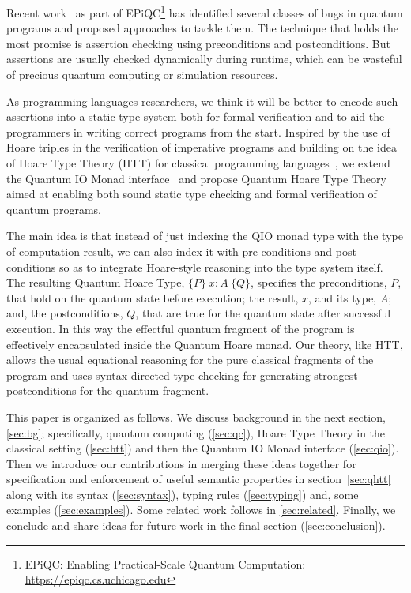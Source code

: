\documentclass[acmsmall,nonacm,timestamp,review=false,anonymous=false]{acmart}
\begin{document}
Recent work~\cite{huang_qdb:_2018,huang_statistical_2019} as part of EPiQC\footnote{EPiQC: Enabling Practical-Scale Quantum Computation:  \url{https://epiqc.cs.uchicago.edu}} has identified several classes of bugs in quantum programs and proposed approaches to tackle them. The technique that holds the most promise is assertion checking using preconditions and postconditions. But assertions are usually checked dynamically during runtime, which can be wasteful of precious quantum computing or simulation resources.

As programming languages researchers, we think it will be better to encode such assertions into a static type system both for formal verification and to aid the programmers in writing correct programs from the start. Inspired by the use of Hoare triples in the verification of imperative programs and building on the idea of Hoare Type Theory (HTT) for classical programming languages~\cite{nanevski_hoare_2008}, we extend the Quantum IO Monad interface~\cite{qio} and propose Quantum Hoare Type Theory aimed at enabling both sound static type checking and formal verification of quantum programs.

The main idea is that instead of just indexing the QIO monad type with the type of computation result, we can also index it with pre-conditions and post-conditions so as to integrate Hoare-style reasoning into the type system itself. The resulting Quantum Hoare Type, $\{P\}\ x{ : }A\ \{Q\}$, specifies the preconditions, $P$, that hold on the quantum state before execution; the result, $x$, and its type, $A$; and, the postconditions, $Q$, that are true for the quantum state after successful execution. In this way the effectful quantum fragment of the program is effectively encapsulated inside the Quantum Hoare monad. Our theory, like HTT, allows the usual equational reasoning for the pure classical fragments of the program and uses syntax-directed type checking for generating strongest postconditions for the quantum fragment.

This paper is organized as follows. We discuss background in the next section, \cref{sec:bg}; specifically, quantum computing (\cref{sec:qc}),  Hoare Type Theory in the classical setting (\cref{sec:htt}) and then the Quantum IO Monad interface (\cref{sec:qio}). Then we introduce our contributions in merging these ideas together for specification and enforcement of useful semantic properties in section~\cref{sec:qhtt} along with its syntax (\cref{sec:syntax}), typing rules (\cref{sec:typing}) and, some examples (\cref{sec:examples}). Some related work follows in \cref{sec:related}. Finally, we conclude and share ideas for future work in the final section (\cref{sec:conclusion}).
\end{document}
